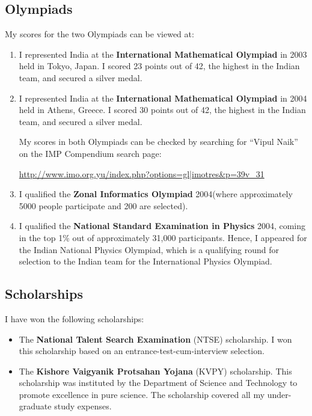 \documentclass[a4paper]{amsart}
\begin{document}
\subsection{Olympiads}

My scores for the two Olympiads can be viewed at:


\begin{enumerate}

\item I represented India at the {\bf International Mathematical
  Olympiad} in 2003 held in Tokyo, Japan. I scored 23 points out of 42,
  the highest in the Indian team, and secured a silver medal.

\item I represented India at the {\bf International Mathematical
    Olympiad} in 2004 held in Athens, Greece. I scored 30 points out
  of 42, the highest in the Indian team, and secured a silver medal.

  My scores in both Olympiads can be checked by searching for ``Vipul Naik''
  on the IMP Compendium search page:

  \url{http://www.imo.org.yu/index.php?options=gl|imotres&p=39v_31}

\item I qualified the {\bf Zonal Informatics Olympiad} 2004(where approximately
  5000 people participate and 200 are selected).

\item I qualified the {\bf National Standard Examination in Physics}
  2004, coming in the top 1\% out of approximately 31,000
  participants. Hence, I appeared for the Indian National Physics
  Olympiad, which is a qualifying round for selection to the Indian
  team for the International Physics Olympiad.
\end{enumerate}

\subsection{Scholarships}

I have won the following scholarships:

\begin{itemize}

\item The {\bf National Talent Search Examination} (NTSE) scholarship.
  I won this scholarship based on an entrance-test-cum-interview selection.

\item The {\bf Kishore Vaigyanik Protsahan Yojana} (KVPY) scholarship.
  This scholarship was instituted by the Department of Science and
  Technology to promote excellence in pure science. The scholarship
  covered all my under-graduate study expenses.
\end{itemize}
\end{document}
